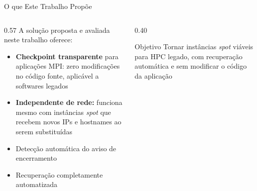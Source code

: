 \documentclass[brazil,aspectratio=169]{lapesd-slides}
\begin{document}
\begin{frame}{O que Este Trabalho Propõe}
    \begin{columns}
        \begin{column}{0.57\textwidth}
            A solução proposta e avaliada neste trabalho oferece:
            \vspace{0.4em}
            \begin{itemize}
                \item \textbf{Checkpoint transparente} para aplicações MPI: zero modificações no código fonte, aplicável a softwares legados
                \vspace{0.3em}
                \item \textbf{Independente de rede:} funciona mesmo com instâncias \textit{spot} que recebem novos IPs e hostnames ao serem substituídas
                \vspace{0.3em}
                \item Detecção automática do aviso de encerramento
                \vspace{0.3em}
                \item Recuperação completamente automatizada
            \end{itemize}
        \end{column}
        \begin{column}{0.40\textwidth}
            \begin{exampleblock}{Objetivo}
                Tornar instâncias \textit{spot} viáveis para HPC legado, com recuperação automática e sem modificar o código da aplicação
            \end{exampleblock}
        \end{column}
    \end{columns}
\end{frame}
\end{document}

